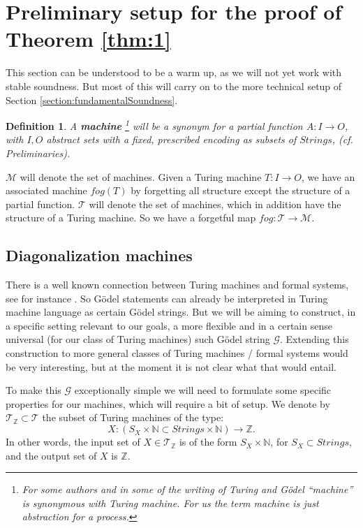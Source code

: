 \documentclass{amsart}  %
\numberwithin{equation}{section}
\newtheorem{definition}[equation]{Definition}
\theoremstyle{definition}
\theoremstyle{remark}
\begin{document}
{\section {Preliminary setup for the proof of Theorem \ref{thm:1}}
This section can be understood to be a warm up, as we will not yet work with stable soundness. But most of this will carry on to the more technical 
setup of Section \ref{section:fundamentalSoundness}.
\begin{definition} A \textbf{\emph{machine}} \footnote {For some authors and in some of the writing of Turing and G\"odel ``machine'' is synonymous with Turing machine. For us the term machine is just abstraction for a process.} will be a synonym for a partial function  $A: I \to O$, with $I,O$ abstract sets with a fixed, prescribed encoding as subsets of $Strings$, (cf. Preliminaries).  
\end{definition} $\mathcal{M}$ will denote the set of machines.  Given a Turing machine $T: I \to O$,  we have an associated machine $fog(T)$ by forgetting all structure except the structure of a partial function.  $\mathcal{T}$ will denote the set of machines, which in addition have the structure of a Turing machine.  So we have a forgetful map $fog: \mathcal{T} \to \mathcal{M}$.

  
\subsection {Diagonalization machines} \label{sec:diagonalizationmachines}
There is a well known connection between Turing machines and formal systems, see for instance \cite{citeFeferman2006-SFEATA}. So G\"odel statements  can already be interpreted in Turing machine language as certain G\"odel strings. But we will be aiming to construct, in a specific setting relevant to our goals, a more flexible and in a certain sense universal (for our class of Turing machines) such G\"odel string $\mathcal{G}$.  Extending this construction to more general classes of Turing machines / formal systems would be very interesting, but at the moment it is not clear what that would entail.  

 To make this $\mathcal{G}$ exceptionally simple we will need to formulate some specific properties for our machines, which will require a bit of setup.  We denote by $\mathcal{T} _{\mathbb{Z}} \subset \mathcal{T} $ the subset of Turing machines of the type: \begin{equation*}
   X:  (S _{X}  \times \mathbb{N} \subset Strings \times \mathbb{N}) \to \mathbb{Z}.
\end{equation*}
In other words, the input set of $X \in \mathcal{T} _{\mathbb{Z}}$ is of the form
$S _{X}  \times \mathbb{N}$, for $S _{X} \subset Strings $, and the output set of $X$ is $\mathbb{Z}$.

}
\end{document}
